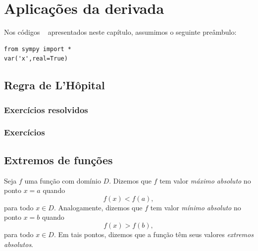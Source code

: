 
\chapter{Aplicações da derivada}\label{cap_apderiv}
\thispagestyle{fancy}

\ifispython
\begin{obs}\label{obs:cap_apderiv_python}
  Nos códigos \sympy~ apresentados neste capítulo, assumimos o seguinte preâmbulo:
\begin{verbatim}
from sympy import *
var('x',real=True)
\end{verbatim}
\end{obs}
\fi

\section{Regra de L'Hôpital}\label{cap_apderiv_sec_lhospital}

\emconstrucao

\subsection*{Exercícios resolvidos}

\emconstrucao

\subsection*{Exercícios}

\emconstrucao

\section{Extremos de funções}\label{cap_apderiv_sec_extfun}

Seja $f$ uma função com domínio $D$. Dizemos que $f$ tem valor \emph{máximo absoluto} no ponto $x=a$ quando
\begin{equation}
  f(x) < f(a),
\end{equation}
para todo $x\in D$. Analogamente, dizemos que $f$ tem valor \emph{mínimo absoluto} no ponto $x=b$ quando
\begin{equation}
  f(x) > f(b),
\end{equation}
para todo $x\in D$. Em tais pontos, dizemos que a função têm seus valores \emph{extremos absolutos}.

